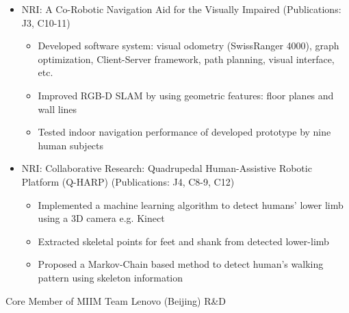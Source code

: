 \begin{cventries}
{\begin{justify}
\begin{itemize}[leftmargin=2ex, nosep, noitemsep]
 		\setlength{\parskip}{0pt}
 		\renewcommand{\labelitemi}{\bullet}
 		\item {NRI: A Co-Robotic Navigation Aid for the Visually Impaired (Publications: J3, C10-11)}
 		\begin{itemize}[leftmargin=3ex]
 			\scriptsize
 			\item {Developed software system: visual odometry (SwissRanger 4000), graph optimization, Client-Server framework, path planning, visual interface, etc.}
 			\item {Improved RGB-D SLAM by using geometric features: floor planes and wall lines}
 			\item {Tested indoor navigation performance of developed prototype by nine human subjects}
 		\end{itemize}
 		\item {NRI: Collaborative Research: Quadrupedal Human-Assistive Robotic Platform (Q-HARP) (Publications: J4, C8-9, C12)}
 		\begin{itemize}[leftmargin=3ex]
 			\scriptsize
 			\item {Implemented a machine learning algorithm to detect humans' lower limb using a 3D camera e.g. Kinect}
 			\item {Extracted skeletal points for feet and shank from detected lower-limb}
 			\item {Proposed a Markov-Chain based method to detect human’s walking pattern using skeleton information}
 		\end{itemize}
 	\end{itemize}
 \end{justify}
 \vspace{-2.0mm}  
    }
	   \cventry
		{Core Member of MIIM Team} %
		{Lenovo (Beijing) R\&D} %

\end{cventries}
